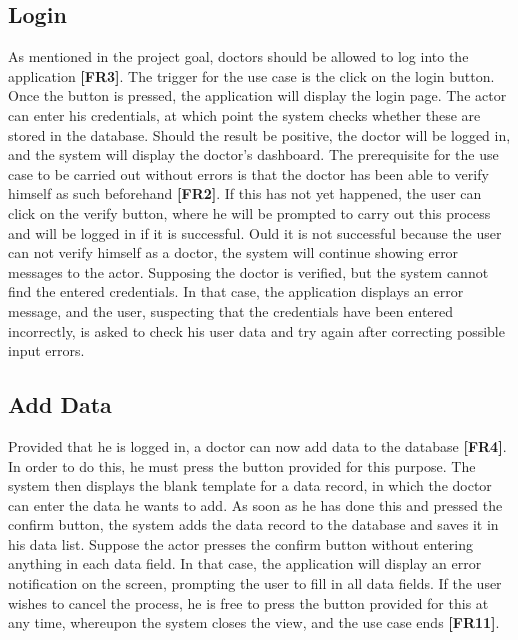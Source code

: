 \subsection{Login}
As mentioned in the project goal, doctors should be allowed to log into the application \textbf{[FR3]}. The trigger for the use case is the click on the login button. Once the button is pressed, the application will display the login page. The actor can enter his credentials, at which point the system checks whether these are stored in the database. Should the result be positive, the doctor will be logged in, and the system will display the doctor's dashboard. The prerequisite for the use case to be carried out without errors is that the doctor has been able to verify himself as such beforehand \textbf{[FR2]}. If this has not yet happened, the user can click on the verify button, where he will be prompted to carry out this process and will be logged in if it is successful. Ould it is not successful because the user can not verify himself as a doctor, the system will continue showing error messages to the actor. Supposing the doctor is verified, but the system cannot find the entered credentials. In that case, the application displays an error message, and the user, suspecting that the credentials have been entered incorrectly, is asked to check his user data and try again after correcting possible input errors.

\subsection{Add Data}
Provided that he is logged in, a doctor can now add data to the database \textbf{[FR4]}. In order to do this, he must press the button provided for this purpose. The system then displays the blank template for a data record, in which the doctor can enter the data he wants to add. As soon as he has done this and pressed the confirm button, the system adds the data record to the database and saves it in his data list. Suppose the actor presses the confirm button without entering anything in each data field. In that case, the application will display an error notification on the screen, prompting the user to fill in all data fields. If the user wishes to cancel the process, he is free to press the button provided for this at any time, whereupon the system closes the view, and the use case ends \textbf{[FR11]}. 

